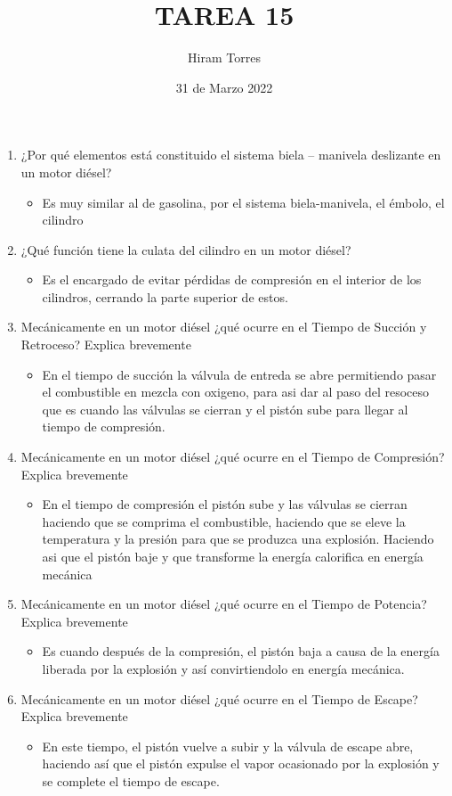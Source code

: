 \documentclass{article}
\title{TAREA 15}
\author{Hiram Torres }
\date{31 de Marzo 2022}
\begin{document}
\maketitle

\begin{enumerate}
    \item ¿Por qué elementos está constituido el sistema biela – manivela deslizante en un motor diésel?
        \begin{itemize}
            \item Es muy similar al de gasolina, por el sistema biela-manivela, el émbolo, el cilindro 
        \end{itemize}
    \item ¿Qué función tiene la culata del cilindro en un motor diésel?
        \begin{itemize}
            \item  Es el encargado de evitar pérdidas de compresión en el interior de los cilindros, cerrando la parte superior de estos.
        \end{itemize}
    \item Mecánicamente en un motor diésel ¿qué ocurre en el Tiempo de Succión y Retroceso? Explica brevemente
        \begin{itemize}
            \item En el tiempo de succión la válvula de entreda se abre permitiendo pasar el combustible en mezcla con oxigeno, para asi dar al paso del resoceso que es cuando las válvulas se cierran y el pistón sube para llegar al tiempo de compresión.  
        \end{itemize}
    \item Mecánicamente en un motor diésel ¿qué ocurre en el Tiempo de Compresión? Explica brevemente 
        \begin{itemize}
            \item En el tiempo de compresión el pistón sube y las válvulas se cierran haciendo que se comprima el combustible, haciendo que se eleve la temperatura y la presión para que se produzca una explosión. Haciendo asi que el pistón baje y que transforme la energía calorifica en energía mecánica 
        \end{itemize}
    \item Mecánicamente en un motor diésel ¿qué ocurre en el Tiempo de Potencia? Explica brevemente
        \begin{itemize}
            \item Es cuando después de la compresión, el pistón baja a causa de la energía liberada por la explosión y así convirtiendolo en energía mecánica.
        \end{itemize}
    \item Mecánicamente en un motor diésel ¿qué ocurre en el Tiempo de Escape? Explica brevemente
        \begin{itemize}
            \item En este tiempo, el pistón vuelve a subir y la válvula de escape abre, haciendo así que el pistón expulse el vapor ocasionado por la explosión y se complete el tiempo de escape. 
        \end{itemize}
        

\end{enumerate}
\end{document}
